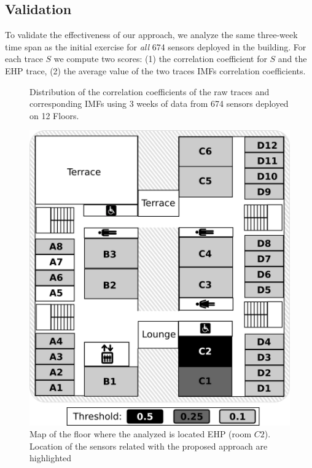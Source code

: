 \subsection{Validation}
To validate the effectiveness of our approach, we analyze the same three-week time span as the
initial exercise for \emph{all} 674 sensors deployed in the building.
For each trace $S$ we compute two scores: (1) the correlation coefficient for $S$ and the EHP trace, (2) the average value of the two traces IMFs correlation coefficients.

\begin{figure}[tbh!]
\centering
 \caption{Distribution of the correlation coefficients of the raw traces and corresponding IMFs using 3 weeks of data from 674 sensors deployed on 12 Floors.}
\label{fig:histo}
\end{figure}

\begin{figure}
\includegraphics[width=.5\textwidth]{img/floorMap.png}
\caption{Map of the floor where the analyzed is located EHP (room $C2$). Location of the sensors related with the proposed approach are highlighted}
\label{fig:map}
\end{figure}


